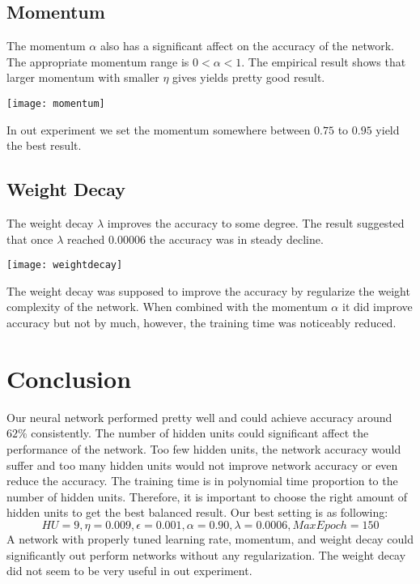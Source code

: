 \documentclass{article}
\begin{document}
\subsection{Momentum}
The momentum $\alpha$ also has a significant affect on the accuracy of the network. The appropriate momentum range is $0<\alpha<1$. The empirical result shows that larger momentum with smaller $\eta$ gives yields pretty good result.

\begin{center}
 \texttt{[image: momentum]}
\end{center}

In out experiment we set the momentum somewhere between $0.75$ to $0.95$ yield the best result.

\subsection{Weight Decay}
The weight decay $\lambda$ improves the accuracy to some degree. The result suggested that once $\lambda$ reached $0.00006$ the accuracy was in steady decline. 

\begin{center}
 \texttt{[image: weightdecay]}
\end{center}

The weight decay was supposed to improve the accuracy by regularize the weight complexity of the network. When combined with the momentum $\alpha$ it did improve accuracy but not by much, however, the training time was noticeably reduced.

\section{Conclusion}
Our neural network performed pretty well and could achieve accuracy around $62\%$ consistently. The number of hidden units could significant affect the performance of the network. Too few hidden units, the network accuracy would suffer and too many hidden units would not improve network accuracy or even reduce the accuracy. The training time is in polynomial time proportion to the number of hidden units. Therefore, it is important to choose the right amount of hidden units to get the best balanced result. Our best setting is as following:
\begin{equation*}
HU=9, \eta=0.009, \epsilon=0.001, \alpha=0.90, \lambda=0.0006,  MaxEpoch=150
\end{equation*}
A network with properly tuned learning rate, momentum, and weight decay could significantly out perform networks without any regularization. The weight decay did not seem to be very useful in out experiment.
\end{document}
